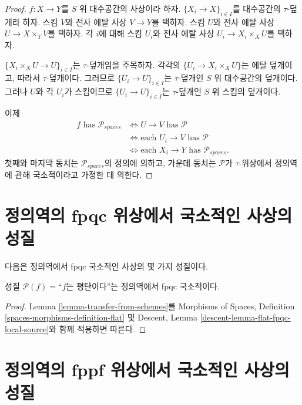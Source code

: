 \begin{proof}
$f:X\to Y$를 $S$ 위 대수공간의 사상이라 하자.
$\{X_i\to X\}_{i\in I}$를 대수공간의 $\tau$-덮개라 하자. 스킴 $V$와
전사 에탈 사상 $V\to Y$를 택하자. 스킴 $U$와 전사 에탈 사상
$U\to X\times_YV$를 택하자. 각 $i$에 대해 스킴 $U_i$와 전사 에탈 사상
$U_i\to X_i\times_XU$를 택하자.

\medskip\noindent
$\{X_i\times_XU\to U\}_{i\in I}$는 $\tau$-덮개임을 주목하자. 각각의
$\{U_i\to X_i\times_XU\}$는 에탈 덮개이고, 따라서 $\tau$-덮개이다.
그러므로 $\{U_i\to U\}_{i\in I}$는 $\tau$-덮개인 $S$ 위 대수공간의
덮개이다. 그러나 $U$와 각 $U_i$가 스킴이므로
$\{U_i\to U\}_{i\in I}$는 $\tau$-덮개인 $S$ 위 스킴의 덮개이다.

\medskip\noindent
이제
\begin{align*}
f \text{ has }\mathcal{P}_{spaces}
& \Leftrightarrow
U \to V \text{ has }\mathcal{P} \\
& \Leftrightarrow
\text{each }U_i \to V \text{ has }\mathcal{P} \\
& \Leftrightarrow
\text{each }X_i \to Y\text{ has }\mathcal{P}_{spaces}.
\end{align*}
첫째와 마지막 동치는 $\mathcal{P}_{spaces}$의 정의에 의하고,
가운데 동치는 $\mathcal{P}$가 $\tau$-위상에서 정의역에 관해
국소적이라고 가정한 데 의한다.
\end{proof}

\section{정의역의 fpqc 위상에서 국소적인 사상의 성질}
\label{section-fpqc-local-source}

\noindent
다음은 정의역에서 fpqc 국소적인 사상의 몇 가지 성질이다.

\begin{lemma}
\label{lemma-flat-fpqc-local-source}
성질 $\mathcal{P}(f)=$``$f$는 평탄이다''는 정의역에서 fpqc 국소적이다.
\end{lemma}

\begin{proof}
Lemma \ref{lemma-transfer-from-schemes}를 Morphisms of Spaces, Definition
\ref{spaces-morphisms-definition-flat} 및 Descent, Lemma
\ref{descent-lemma-flat-fpqc-local-source}와 함께 적용하면 따른다.
\end{proof}

\section{정의역의 fppf 위상에서 국소적인 사상의 성질}
\label{section-fppf-local-source}

